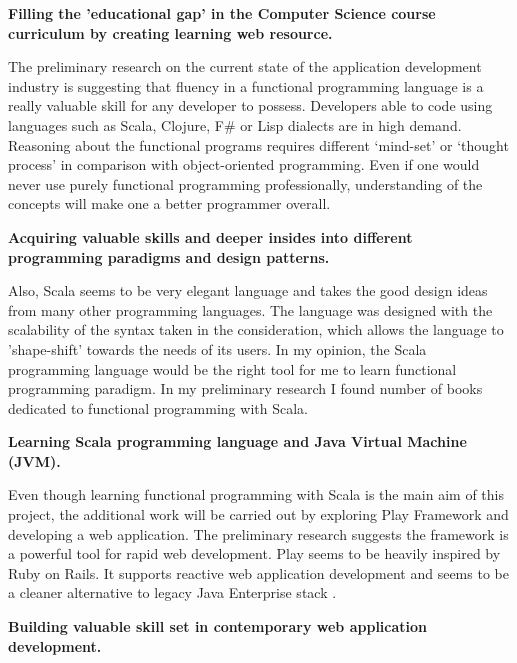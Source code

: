 \documentclass[12pt,twoside,a4paper]{report}
\begin{document}
\textbullet \textbf{ Filling the 'educational gap' in the Computer Science course curriculum by creating learning web resource.}

The preliminary research on the current state of the application development industry is suggesting that fluency in a functional programming language is a really valuable skill for any developer to possess. Developers able to code using languages such as Scala, Clojure, F\# or Lisp dialects are in high demand. Reasoning about the functional programs requires different ‘mind-set’ or ‘thought process’ in comparison with object-oriented programming. Even if one would never use purely functional programming professionally, understanding of the concepts will make one a better programmer overall.

\textbullet \textbf{ Acquiring valuable skills and deeper insides into different programming paradigms and design patterns.}

Also, Scala seems to be very elegant language and takes the good design ideas from many other programming languages. The language was designed with the scalability of the syntax taken in the consideration, which allows the language to 'shape-shift' towards the needs of its users. In my opinion, the Scala programming language would be the right tool for me to learn functional programming paradigm. In my preliminary research I found number of books dedicated to functional programming with Scala.

\textbullet \textbf{ Learning Scala programming language and Java Virtual Machine (JVM).}

Even though learning functional programming with Scala is the main aim of this project, the additional work will be carried out by exploring Play Framework and developing a web application. The preliminary research suggests the framework is a powerful tool for rapid web development. Play seems to be heavily inspired by Ruby on Rails. It supports reactive web application development and seems to be a cleaner alternative to legacy Java Enterprise stack \cite{8}.

\textbullet \textbf{ Building valuable skill set in contemporary web application development.}

\end{document}
